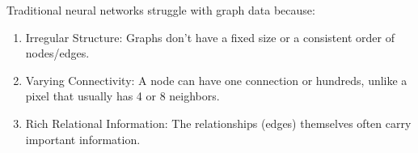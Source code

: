 Traditional neural networks struggle with graph data because:
\begin{enumerate}
\item Irregular Structure: Graphs don't have a fixed size or a
  consistent order of nodes/edges.
\item Varying Connectivity: A node can have one connection or
  hundreds, unlike a pixel that usually has 4 or 8 neighbors.
\item Rich Relational Information: The relationships (edges)
  themselves often carry important information.
\end{enumerate}

